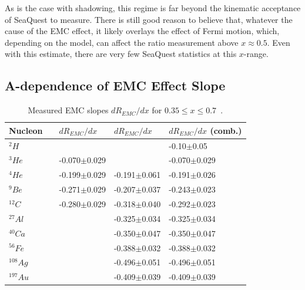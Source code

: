 As is the case with shadowing, this regime is far beyond the kinematic acceptance of SeaQuest to measure. There is still good reason to believe that, whatever the cause of the EMC effect, it likely overlays the effect of Fermi motion, which, depending on the model, can affect the ratio measurement above $x\approx0.5$. Even with this estimate, there are very few SeaQuest statistics at this $x$-range.

\subsection{A-dependence of EMC Effect Slope}

\begin{table}
	\centering
	\setlength{\tabcolsep}{2em}
	\begin{tabular}{@{}lllll@{}}\toprule
		Nucleon & & $dR_{EMC}/dx$~\cite{Seely:2009gt} & $dR_{EMC}/dx$~\cite{Gomez:1993ri} & $dR_{EMC}/dx$ (comb.) \\ \midrule    
		$^2H$ & &                                      &                                   & -0.10$\pm$0.05~\cite{Griffioen:2015hxa} \\
		$^3He$ & & -0.070$\pm$0.029     &                                 & -0.070$\pm$0.029 \\
		$^4He$ & & -0.199$\pm$0.029        & -0.191$\pm$0.061   & -0.191$\pm$0.026 \\
		$^9Be$ & & -0.271$\pm$0.029         & -0.207$\pm$0.037  & -0.243$\pm$0.023 \\
		$^{12}C$ & & -0.280$\pm$0.029    & -0.318$\pm$0.040  & -0.292$\pm$0.023 \\
		$^{27}Al$ & &                                 & -0.325$\pm$0.034  & -0.325$\pm$0.034 \\
		$^{40}Ca$ & &                                 & -0.350$\pm$0.047 & -0.350$\pm$0.047 \\
		$^{56}Fe$ & &                                 & -0.388$\pm$0.032 & -0.388$\pm$0.032 \\
		$^{108}Ag$ & &                                 & -0.496$\pm$0.051 & -0.496$\pm$0.051 \\
		$^{197}Au$ & &                                 & -0.409$\pm$0.039 & -0.409$\pm$0.039 \\ \bottomrule        
	\end{tabular}
	\caption{Measured EMC slopes $dR_{EMC}/dx$ for $0.35\leq x \leq 0.7$~\cite{Piasetzky:2011zz}.}
	\label{tab:emc-slopes}
\end{table}

